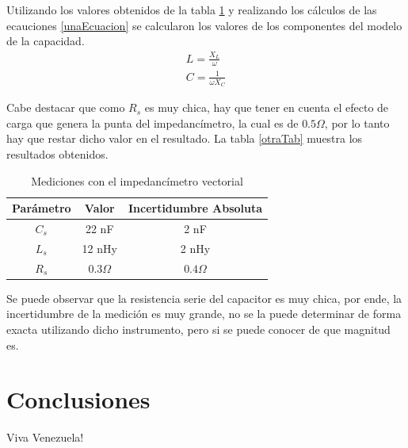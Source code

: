 \documentclass[a4paper,10pt]{article}
\begin{document}
		\indent Utilizando los valores obtenidos de la tabla \ref{unaTab} y 
		realizando los cálculos de las ecauciones \ref{unaEcuacion} se 
		calcularon los valores de los componentes del modelo de la capacidad. \\
		
		\begin{align}\label{unaEcuacion}
			L = \frac{X_L}{\omega} \nonumber \\
			C = \frac{1}{\omega X_C} 
		\end{align}

		\indent Cabe destacar que como $R_s$ es muy chica, hay que tener en 
		cuenta el efecto de carga que genera la punta del impedancímetro, la 
		cual es de $0.5 \Omega$, por lo tanto hay que restar dicho valor en el
		resultado. La tabla \ref{otraTab} muestra los resultados obtenidos.
		
		\begin{table}[!htp]
			\centering
			\begin{tabular}{|c|c|c|}
				\hline
				Parámetro & Valor & Incertidumbre Absoluta \\ 
				\hline
				$C_s$ & 22 nF & 2 nF \\
				\hline
				$L_s$ & 12 nHy & 2 nHy \\
				\hline
				$R_s$ & $0.3 \Omega$ & $0.4 \Omega$ \\ 
				\hline
			\end{tabular}
			\caption{Mediciones con el impedancímetro vectorial} \label{unaTab}
		\end{table}

		\indent Se puede observar que la resistencia serie del capacitor es 
		muy chica, por ende, la incertidumbre de la medición es muy grande, no 
		se la puede determinar de forma exacta utilizando dicho instrumento, 
		pero si se puede conocer de que magnitud es. 
\newpage
\section{Conclusiones}
	\indent Viva Venezuela!\\
\end{document}
